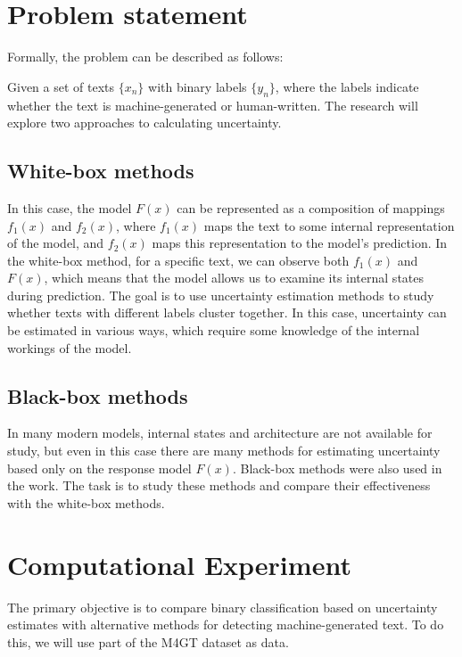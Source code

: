 \documentclass[a4paper, 12pt]{article}
\begin{document}
\section{Problem statement}

Formally, the problem can be described as follows:  

Given a set of texts \(\{x_n\}\) with binary labels \(\{y_n\}\), where the labels indicate whether the text is machine-generated or human-written. The research will explore two approaches to calculating uncertainty.

\subsection {White-box methods}  
In this case, the model \(F(x)\) can be represented as a composition of mappings \(f_1(x)\) and \(f_2(x)\), where \(f_1(x)\) maps the text to some internal representation of the model, and \(f_2(x)\) maps this representation to the model's prediction. In the white-box method, for a specific text, we can observe both \(f_1(x)\) and \(F(x)\), which means that the model allows us to examine its internal states during prediction. The goal is to use uncertainty estimation methods to study whether texts with different labels cluster together. In this case, uncertainty can be estimated in various ways\citep{Polygraph}, which require some knowledge of the internal workings of the model. 

\subsection {Black-box methods}   
In many modern models, internal states and architecture are not available for study, but even in this case there are many methods for estimating uncertainty based only on the response model \(F(x)\). Black-box methods were also used in the work\citep{Polygraph}. The task is to study these methods and compare their effectiveness with the white-box methods. 

\section{Computational Experiment}

The primary objective is to compare binary classification based on uncertainty estimates with alternative methods for detecting machine-generated text. To do this, we will use part of the M4GT\citep{wang2024m4gt} dataset as data. 
\end{document}

